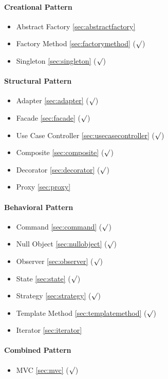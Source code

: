 \paragraph{Creational Pattern} \hfill
\begin{itemize}
	\item Abstract Factory \ref{sec:abstractfactory}
	\item Factory Method \ref{sec:factorymethod} ($\surd$)
	\item Singleton \ref{sec:singleton} ($\surd$)
\end{itemize}

\paragraph{Structural Pattern} \hfill
\begin{itemize}
	\item Adapter \ref{sec:adapter} ($\surd$)
	\item Facade \ref{sec:facade} ($\surd$)
	\item Use Case Controller \ref{sec:usecasecontroller} ($\surd$)
	\item Composite \ref{sec:composite} ($\surd$)
	\item Decorator \ref{sec:decorator} ($\surd$)
	\item Proxy \ref{sec:proxy} 
\end{itemize}

\paragraph{Behavioral Pattern} \hfill
\begin{itemize}
	\item Command \ref{sec:command} ($\surd$)
	\item Null Object \ref{sec:nullobject} ($\surd$)
	\item Observer \ref{sec:observer} ($\surd$)
	\item State \ref{sec:state} ($\surd$)
	\item Strategy \ref{sec:strategy} ($\surd$)
	\item Template Method \ref{sec:templatemethod} ($\surd$)
	\item Iterator \ref{sec:iterator}
\end{itemize}

\paragraph{Combined Pattern} \hfill
\begin{itemize}
	\item MVC \ref{sec:mvc} ($\surd$)
\end{itemize}
\clearpage

